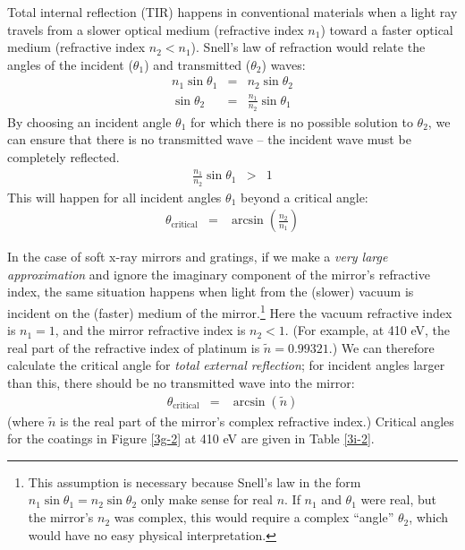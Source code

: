 Total internal reflection (TIR) happens in conventional materials when a light ray travels from a slower optical medium (refractive index $n_1$) toward a faster optical medium (refractive index $n_2 < n_1$).  Snell's law of refraction would relate the angles of the incident ($\theta_1$) and transmitted ($\theta_2$) waves:
\begin{eqnarray}
n_1 \sin \theta_1 &=& n_2 \sin \theta_2 \\
\sin \theta_2 &=& \frac{n_1}{n_2} \sin \theta_1
\end{eqnarray}
By choosing an incident angle $\theta_1$ for which there is no possible solution to $\theta_2$, we can ensure that there is no transmitted wave -- the incident wave must be completely reflected.
\begin{eqnarray}
 \frac{n_1}{n_2} \sin \theta_1 &>& 1
\end{eqnarray}
This will happen for all incident angles $\theta_1$ beyond a critical angle:
\begin{eqnarray}
\theta_{\mathrm{critical}} &=& \arcsin \left( \frac{n_2}{n_1} \right)
\end{eqnarray}

In the case of soft x-ray mirrors and gratings, if we make a \emph{very large approximation} and ignore the imaginary component of the mirror's refractive index, the same situation happens when light from the (slower) vacuum is incident on the (faster) medium of the mirror.\footnote{This assumption is necessary because Snell's law in the form $n_1 \sin \theta_1 = n_2 \sin \theta_2$ only make sense for real $n$.  If $n_1$ and $\theta_1$ were real, but the mirror's $n_2$ was complex, this would require a complex ``angle'' $\theta_2$, which would have no easy physical interpretation.}  Here the vacuum refractive index is $n_1=1$, and the mirror refractive index is ${n}_2<1$.  (For example, at 410 eV, the real part of the refractive index of platinum is $\tilde{n} = 0.99321$.)  We can therefore calculate the critical angle for \emph{total external reflection}; for incident angles larger than this, there should be no transmitted wave into the mirror:
\begin{eqnarray}
\theta_{\mathrm{critical}} &=& \arcsin \left( \tilde n \right)
\end{eqnarray}
(where $\tilde n$ is the real part of the mirror's complex refractive index.)  Critical angles for the coatings in Figure \ref{3g-2} at 410 eV are given in Table \ref{3i-2}.


